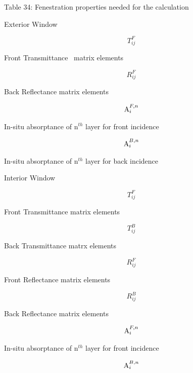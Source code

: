 Table 34: Fenestration properties needed for the calculation

Exterior Window

\begin{equation}
T_{ij}^F
\end{equation}

Front Transmittance~ matrix elements

\begin{equation}
R_{ij}^F
\end{equation}

Back Reflectance matrix elements

\begin{equation}
{\mathop{\rm A}\nolimits}_i^{F,n}
\end{equation}

In-situ absorptance of n\(^{th}\) layer for front incidence

\begin{equation}
{\mathop{\rm A}\nolimits}_i^{B,n}
\end{equation}

In-situ absorptance of n\(^{th}\) layer for back incidence

Interior Window

\begin{equation}
T_{ij}^F
\end{equation}

Front Transmittance matrix elements

\begin{equation}
T_{ij}^B
\end{equation}

Back Transmittance matrx elements

\begin{equation}
R_{ij}^F
\end{equation}

Front Reflectance matrix elements

\begin{equation}
R_{ij}^B
\end{equation}

Back Reflectance matrix elements

\begin{equation}
{\mathop{\rm A}\nolimits}_i^{F,n}
\end{equation}

In-situ absorptance of n\(^{th}\) layer for front incidence

\begin{equation}
{\mathop{\rm A}\nolimits}_i^{B,n}
\end{equation}

